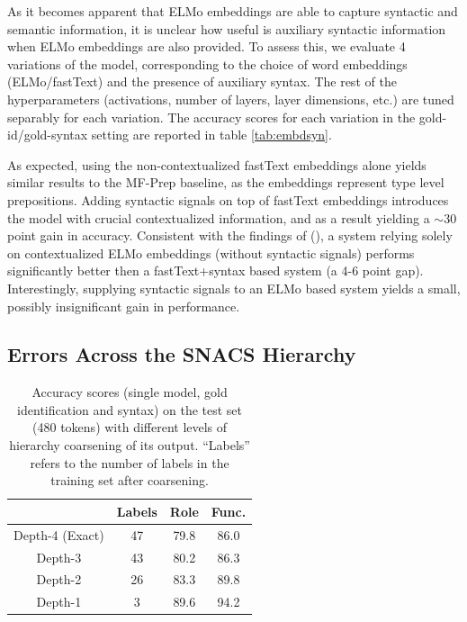 As it becomes apparent that ELMo embeddings are able to capture syntactic and semantic information, it is unclear how useful is auxiliary syntactic information when ELMo embeddings are also provided. To assess this, we evaluate 4 variations of the model, corresponding to the choice of word embeddings (ELMo/fastText) and the presence of auxiliary syntax. The rest of the hyperparameters (activations, number of layers, layer dimensions, etc.) are tuned separably for each variation. The accuracy scores for each variation in the gold-id/gold-syntax setting are reported in table \ref{tab:embdsyn}.

As expected, using the non-contextualized fastText embeddings alone yields similar results to the MF-Prep baseline, as the embeddings represent type level prepositions. Adding syntactic signals on top of fastText embeddings introduces the model with crucial contextualized information, and as a result yielding a $\sim$30 point gain in accuracy. Consistent with the findings of (\cite{nelson}), a system relying solely on contextualized ELMo embeddings (without syntactic signals) performs significantly better then a fastText+syntax based system (a 4-6 point gap). Interestingly, supplying syntactic signals to an ELMo based system yields a small, possibly insignificant gain in performance. 

\subsection{Errors Across the SNACS Hierarchy}

\begin{table}[]
    \setlength{\tabcolsep}{10pt} %
    \renewcommand{\arraystretch}{1.5}
    \centering
    \begin{tabular}{|c|c|c|c|}
        \hline
            & Labels & Role & Func.\\ \hline
         Depth-4 (Exact) & 47 & 79.8 & 86.0\\ \hline
         Depth-3 & 43 & 80.2 & 86.3 \\ \hline
         Depth-2 & 26 & 83.3 & 89.8 \\ \hline
         Depth-1 & 3 & 89.6 & 94.2 \\ \hline
          
    \end{tabular}
    \caption{Accuracy scores (single model, gold identification and syntax) on the test set (480 tokens) with different levels of hierarchy coarsening of its output. “Labels” refers to the number of labels in the training set after coarsening.}
    \label{tab:coarsening}
\end{table}

